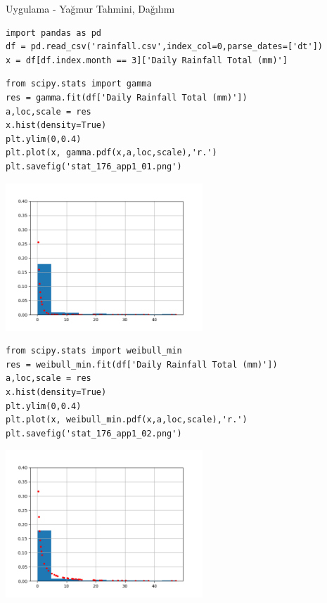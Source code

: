 \documentclass[12pt,fleqn]{article}\usepackage{../../common}
\begin{document}
Uygulama - Yağmur Tahmini, Dağılımı


\begin{verbatim}
import pandas as pd
df = pd.read_csv('rainfall.csv',index_col=0,parse_dates=['dt'])
x = df[df.index.month == 3]['Daily Rainfall Total (mm)']
\end{verbatim}

\begin{verbatim}
from scipy.stats import gamma
res = gamma.fit(df['Daily Rainfall Total (mm)'])
a,loc,scale = res  
x.hist(density=True)
plt.ylim(0,0.4)
plt.plot(x, gamma.pdf(x,a,loc,scale),'r.')
plt.savefig('stat_176_app1_01.png')
\end{verbatim}

\includegraphics[width=20em]{stat_176_app1_01.png}

\begin{verbatim}
from scipy.stats import weibull_min
res = weibull_min.fit(df['Daily Rainfall Total (mm)'])
a,loc,scale = res  
x.hist(density=True)
plt.ylim(0,0.4)
plt.plot(x, weibull_min.pdf(x,a,loc,scale),'r.')
plt.savefig('stat_176_app1_02.png')
\end{verbatim}

\includegraphics[width=20em]{stat_176_app1_02.png}
\end{document}
